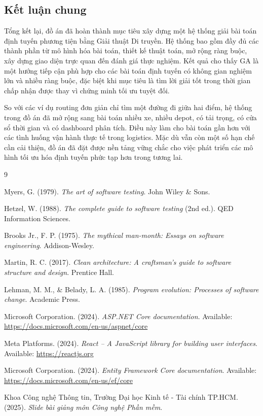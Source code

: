 \documentclass[12pt,a4paper]{article}
\numberwithin{figure}{subsection}
\renewcommand{\refname}{Tài liệu tham khảo}
\begin{document}
\subsection{Kết luận chung}

Tổng kết lại, đồ án đã hoàn thành mục tiêu xây dựng một hệ thống giải bài toán định tuyến phương tiện bằng Giải thuật Di truyền. Hệ thống bao gồm đầy đủ các thành phần từ mô hình hóa bài toán, thiết kế thuật toán, mở rộng ràng buộc, xây dựng giao diện trực quan đến đánh giá thực nghiệm. Kết quả cho thấy GA là một hướng tiếp cận phù hợp cho các bài toán định tuyến có không gian nghiệm lớn và nhiều ràng buộc, đặc biệt khi mục tiêu là tìm lời giải tốt trong thời gian chấp nhận được thay vì chứng minh tối ưu tuyệt đối.

So với các ví dụ routing đơn giản chỉ tìm một đường đi giữa hai điểm, hệ thống trong đồ án đã mở rộng sang bài toán nhiều xe, nhiều depot, có tải trọng, có cửa sổ thời gian và có dashboard phân tích. Điều này làm cho bài toán gần hơn với các tình huống vận hành thực tế trong logistics. Mặc dù vẫn còn một số hạn chế cần cải thiện, đồ án đã đặt được nền tảng vững chắc cho việc phát triển các mô hình tối ưu hóa định tuyến phức tạp hơn trong tương lai.
\newpage
{} 

\addcontentsline{toc}{section}{\refname} 
\renewcommand{\refname}{Tài liệu tham khảo}
\begin{thebibliography}{9}

Myers, G. (1979). \textit{The art of software testing}. John Wiley \& Sons.

Hetzel, W. (1988). \textit{The complete guide to software testing} (2nd ed.). QED Information Sciences.

Brooks Jr., F. P. (1975). \textit{The mythical man-month: Essays on software engineering}. Addison-Wesley.

Martin, R. C. (2017). \textit{Clean architecture: A craftsman's guide to software structure and design}. Prentice Hall.

Lehman, M. M., \& Belady, L. A. (1985). \textit{Program evolution: Processes of software change}. Academic Press.

Microsoft Corporation. (2024). \textit{ASP.NET Core documentation}. Available: \url{https://docs.microsoft.com/en-us/aspnet/core}

Meta Platforms. (2024). \textit{React – A JavaScript library for building user interfaces}. Available: \url{https://reactjs.org}

Microsoft Corporation. (2024). \textit{Entity Framework Core documentation}. Available: \url{https://docs.microsoft.com/en-us/ef/core}

Khoa Công nghệ Thông tin, Trường Đại học Kinh tế - Tài chính TP.HCM. (2025). \textit{Slide bài giảng môn Công nghệ Phần mềm}.

\end{thebibliography}
\newpage
\end{document}
